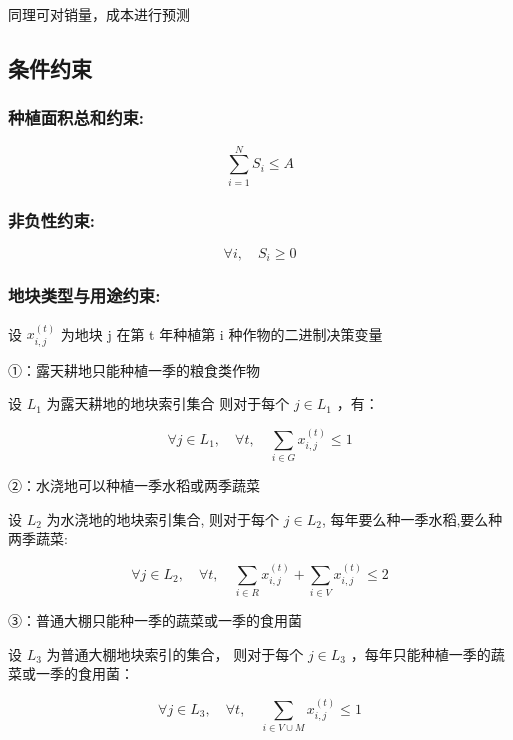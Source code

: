 \documentclass[12pt]{ctexart}
\begin{document}
	同理可对销量，成本进行预测
	
	\subsection{条件约束}
	\subsubsection{种植面积总和约束:}
	
	\begin{equation}
	\sum_{i=1}^N S_i \leq A
\end{equation}
	
	\subsubsection{非负性约束:}
	\[
	\forall i ,\quad S_i \geq 0
	\]
	
\subsubsection{地块类型与用途约束:}
	
	设 $x_{i, j}^{(t)}$ 为地块 j 在第 t 年种植第 i 种作物的二进制决策变量
	
	
	①：露天耕地只能种植一季的粮食类作物
	
	设 $L_1$ 为露天耕地的地块索引集合
	则对于每个 $j \in L_1$ ，有：
	
	\begin{equation}
	\forall j \in L_1, \quad \forall t, \quad \sum_{i \in G} x_{i, j}^{(t)} \leq 1
\end{equation}
	
	②：水浇地可以种植一季水稻或两季蔬菜
	
	设 $L_2$ 为水浇地的地块索引集合, 则对于每个 $j \in L_2$, 每年要么种一季水稻,要么种两季蔬菜:
	
	\begin{equation}
	\forall j \in L_2, \quad \forall t, \quad \sum_{i \in R} x_{i, j}^{(t)}+\sum_{i \in V} x_{i, j}^{(t)} \leq 2
\end{equation}
	
	③：普通大棚只能种一季的蔬菜或一季的食用菌
	
	设 $L_3$ 为普通大棚地块索引的集合，
	则对于每个 $j \in L_3$ ，每年只能种植一季的蔬菜或一季的食用菌：
	
	\begin{equation}
	\forall j \in L_3, \quad \forall t, \quad \sum_{i \in V \cup M} x_{i, j}^{(t)} \leq 1
\end{equation}
	
\end{document}
